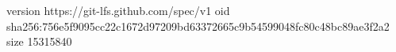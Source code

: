 version https://git-lfs.github.com/spec/v1
oid sha256:756e5f9095cc22c1672d97209bd63372665c9b54599048fc80c48bc89ae3f2a2
size 15315840
